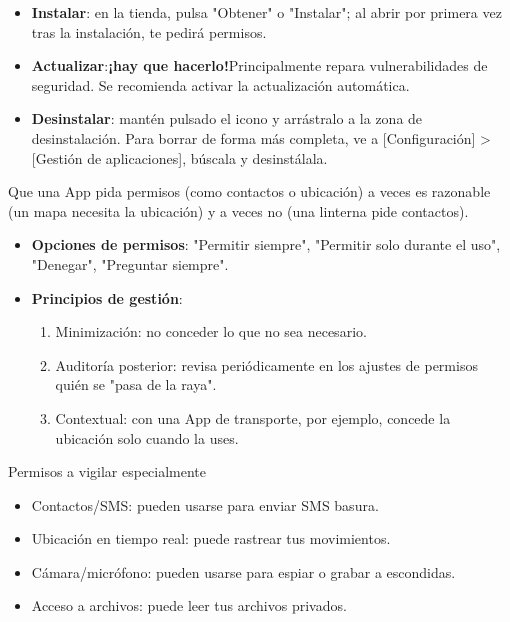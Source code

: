 
\begin{itemize}
  \item \textbf{Instalar}: en la tienda, pulsa "Obtener" o "Instalar"; al abrir por primera vez tras la instalación, te pedirá permisos.
  \item \textbf{Actualizar}:\textbf{¡hay que hacerlo!}Principalmente repara vulnerabilidades de seguridad. Se recomienda activar la actualización automática.
  \item \textbf{Desinstalar}: mantén pulsado el icono y arrástralo a la zona de desinstalación. Para borrar de forma más completa, ve a [Configuración] > [Gestión de aplicaciones], búscala y desinstálala.
\end{itemize}


Que una App pida permisos (como contactos o ubicación) a veces es razonable (un mapa necesita la ubicación) y a veces no (una linterna pide contactos).

\begin{itemize}
  \item \textbf{Opciones de permisos}: "Permitir siempre", "Permitir solo durante el uso", "Denegar", "Preguntar siempre".
  \item \textbf{Principios de gestión}:
  \begin{enumerate}
    \item Minimización: no conceder lo que no sea necesario.
    \item Auditoría posterior: revisa periódicamente en los ajustes de permisos quién se "pasa de la raya".
    \item Contextual: con una App de transporte, por ejemplo, concede la ubicación solo cuando la uses.
  \end{enumerate}
\end{itemize}

\begin{tcbwarn}{Permisos a vigilar especialmente}
\begin{itemize}
  \item Contactos/SMS: pueden usarse para enviar SMS basura.
  \item Ubicación en tiempo real: puede rastrear tus movimientos.
  \item Cámara/micrófono: pueden usarse para espiar o grabar a escondidas.
  \item Acceso a archivos: puede leer tus archivos privados.
\end{itemize}

\end{tcbwarn}

